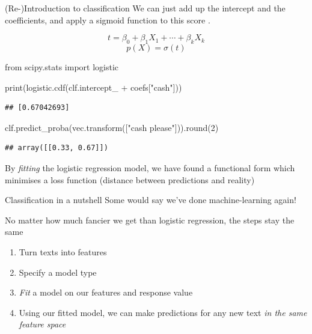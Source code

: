 \documentclass[
  10pt,
  ignorenonframetext,
  aspectratio=169]{beamer}
\newenvironment{Shaded}{\begin{snugshade}}{\end{snugshade}}
\newcommand{\BuiltInTok}[1]{\textcolor[rgb]{0.80,0.80,0.80}{#1}}
\newcommand{\DecValTok}[1]{\textcolor[rgb]{0.86,0.86,0.80}{#1}}
\newcommand{\ImportTok}[1]{\textcolor[rgb]{0.80,0.80,0.80}{#1}}
\newcommand{\NormalTok}[1]{\textcolor[rgb]{0.80,0.80,0.80}{#1}}
\newcommand{\OperatorTok}[1]{\textcolor[rgb]{0.94,0.94,0.82}{#1}}
\newcommand{\StringTok}[1]{\textcolor[rgb]{0.80,0.58,0.58}{#1}}
\begin{document}
\begin{frame}[fragile]{(Re-)Introduction to classification}
\protect\hypertarget{re-introduction-to-classification-2}{}
We can just add up the intercept and the coefficients, and apply a
sigmoid function to this score .

\[ t = \beta_0 + \beta_1X_1 + \cdots + \beta_kX_k\] \[p(X) = \sigma(t)\]

\medskip
\scriptsize

\begin{Shaded}
\begin{Highlighting}[]
\ImportTok{from}\NormalTok{ scipy.stats }\ImportTok{import}\NormalTok{ logistic}

\BuiltInTok{print}\NormalTok{(logistic.cdf(clf.intercept\_ }\OperatorTok{+}\NormalTok{ coefs[}\StringTok{"cash"}\NormalTok{]))}
\end{Highlighting}
\end{Shaded}

\begin{verbatim}
## [0.67042693]
\end{verbatim}

\begin{Shaded}
\begin{Highlighting}[]
\NormalTok{clf.predict\_proba(vec.transform([}\StringTok{"cash please"}\NormalTok{])).}\BuiltInTok{round}\NormalTok{(}\DecValTok{2}\NormalTok{)}
\end{Highlighting}
\end{Shaded}

\begin{verbatim}
## array([[0.33, 0.67]])
\end{verbatim}

\normalsize

By \emph{fitting} the logistic regression model, we have found a
functional form which minimises a loss function (distance between
predictions and reality)
\end{frame}

\begin{frame}{Classification in a nutshell}
\protect\hypertarget{classification-in-a-nutshell}{}
Some would say we've done machine-learning again!

No matter how much fancier we get than logistic regression, the steps
stay the same

\begin{enumerate}
  \item<1->Turn texts into features
  \item<2->Specify a model type
  \item<3->\textit{Fit} a model on our features and response value
  \item<4->Using our fitted model, we can make predictions for any new text \textit{in the same feature space}
\end{enumerate}
\end{frame}
\end{document}
